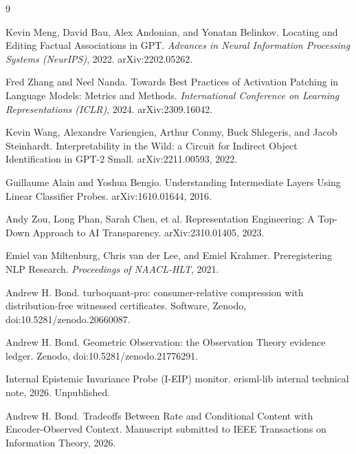 \documentclass[11pt]{article}
\begin{document}
\begin{thebibliography}{9}

 Kevin Meng, David Bau, Alex Andonian, and Yonatan Belinkov.
Locating and Editing Factual Associations in GPT. \emph{Advances in Neural
Information Processing Systems (NeurIPS)}, 2022. arXiv:2202.05262.

 Fred Zhang and Neel Nanda. Towards Best Practices of
Activation Patching in Language Models: Metrics and Methods. \emph{International
Conference on Learning Representations (ICLR)}, 2024. arXiv:2309.16042.

 Kevin Wang, Alexandre Variengien, Arthur Conmy, Buck
Shlegeris, and Jacob Steinhardt. Interpretability in the Wild: a Circuit for
Indirect Object Identification in GPT-2 Small. arXiv:2211.00593, 2022.

 Guillaume Alain and Yoshua Bengio. Understanding Intermediate
Layers Using Linear Classifier Probes. arXiv:1610.01644, 2016.

 Andy Zou, Long Phan, Sarah Chen, et al. Representation
Engineering: A Top-Down Approach to AI Transparency. arXiv:2310.01405, 2023.

 Emiel van Miltenburg, Chris van der Lee, and Emiel
Krahmer. Preregistering NLP Research. \emph{Proceedings of NAACL-HLT}, 2021.

 Andrew H. Bond. turboquant-pro: consumer-relative
compression with distribution-free witnessed certificates. Software, Zenodo,
doi:10.5281/zenodo.20660087.

 Andrew H. Bond. Geometric Observation: the Observation Theory
evidence ledger. Zenodo, doi:10.5281/zenodo.21776291.

 Internal Epistemic Invariance Probe (I-EIP) monitor. erisml-lib
internal technical note, 2026. Unpublished.

 Andrew H. Bond. Tradeoffs Between Rate and Conditional Content
with Encoder-Observed Context. Manuscript submitted to IEEE Transactions on
Information Theory, 2026.

\end{thebibliography}
\end{document}
